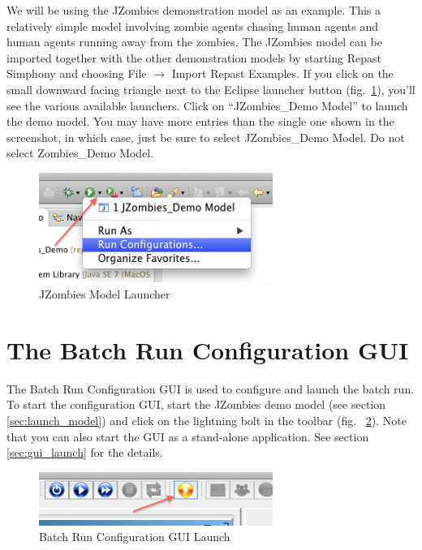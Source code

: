 \documentclass[11pt]{amsart}
\begin{document}
\label{sec:launch_model}
We will be using the JZombies demonstration model as an example. This a relatively simple model involving zombie agents chasing human agents and human agents running away from the zombies. The JZombies model can be imported together with the other demonstration models by starting Repast Simphony and choosing File $\rightarrow$ Import Repast Examples. If you click on the small downward facing triangle next to the Eclipse launcher button (fig.~\ref{fig:launch}), you'll see the various available launchers. Click on ``JZombies\_Demo Model'' to launch the demo model. You may have more entries than the single one shown in the screenshot, in which case, just be sure to select JZombies\_Demo Model. Do not select Zombies\_Demo Model.

\begin{figure}[h]
\begin{center}
\vspace{.2in}
\centerline {
\includegraphics[width=3in]{images/zombies_launch.png}
}
\caption{JZombies Model Launcher}
\label{fig:launch}
\end{center}
\end{figure}

\section{The Batch Run Configuration GUI}
\label{sec:gui}
The  Batch Run Configuration GUI is used to configure and launch the batch run. To start the configuration GUI, start the JZombies demo model (see section \ref{sec:launch_model}) and click on the lightning bolt in the toolbar (fig. ~\ref{fig:gui_launch}). Note that you can also start the GUI as a stand-alone application. See section \ref{sec:gui_launch} for the details.

\begin{figure}[h]
\begin{center}
\vspace{.2in}
\centerline {
\includegraphics[width=3in]{images/gui_launch.png}
}
\caption{Batch Run Configuration GUI Launch}
\label{fig:gui_launch}
\end{center}
\end{figure}
\end{document}
